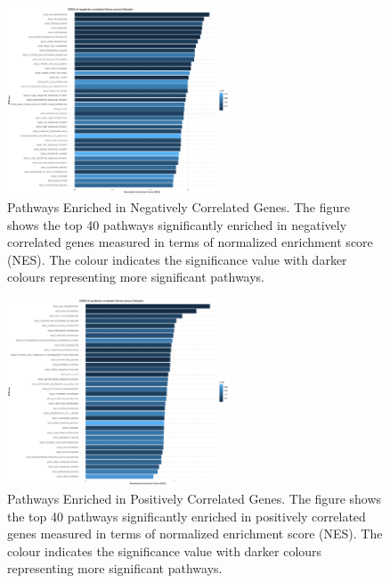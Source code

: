 \documentclass[5p]{elsarticle}
\begin{document}
\begin{figure}[t] %
	\centering
	
	\includegraphics[width=250px]{../figures/negatively_correlated_pathways.png}
	
	\caption{Pathways Enriched in Negatively Correlated Genes. The figure shows the top 40 pathways significantly enriched in negatively correlated genes measured in terms of normalized enrichment score (NES). The colour indicates the significance value with darker colours representing more significant pathways.}
	\label{figure3}
\end{figure}

\begin{figure}[t] %
	\centering
	
	\includegraphics[width=250px]{../figures/positively_correlated_pathways.png}
	
	\caption{Pathways Enriched in Positively Correlated Genes. The figure shows the top 40 pathways significantly enriched in positively correlated genes measured in terms of normalized enrichment score (NES). The colour indicates the significance value with darker colours representing more significant pathways.}
	\label{figure4}
\end{figure}
\end{document}
